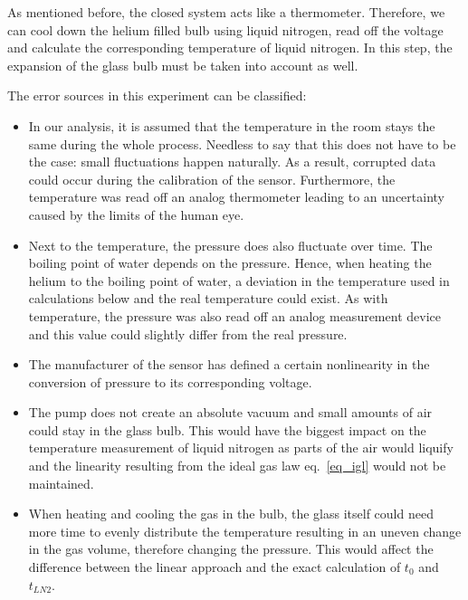     As mentioned before, the closed system acts like a thermometer.
    Therefore, we can cool down the helium filled bulb using liquid nitrogen, read off the voltage and calculate the corresponding temperature of liquid nitrogen.
    In this step, the expansion of the glass bulb must be taken into account as well.

    The error sources in this experiment can be classified:
    \begin{itemize}
        \item In our analysis, it is assumed that the temperature in the room stays the same during the whole process.
        Needless to say that this does not have to be the case: small fluctuations happen naturally.
        As a result, corrupted data could occur during the calibration of the sensor.
        Furthermore, the temperature was read off an analog thermometer leading to an uncertainty caused by the limits of the human eye.
        \item Next to the temperature, the pressure does also fluctuate over time.
        The boiling point of water depends on the pressure.
        Hence, when heating the helium to the boiling point of water, a deviation in the temperature used in calculations below and the real temperature could exist.
        As with temperature, the pressure was also read off an analog measurement device and this value could slightly differ from the real pressure.
        \item The manufacturer of the sensor has defined a certain nonlinearity in the conversion of pressure to its corresponding voltage.
        \item The pump does not create an absolute vacuum and small amounts of air could stay in the glass bulb.
        This would have the biggest impact on the temperature measurement of liquid nitrogen as parts of the air would liquify and the linearity resulting from the ideal gas law eq.~\ref{eq_igl} would not be maintained.
        \item When heating and cooling the gas in the bulb, the glass itself could need more time to evenly distribute the temperature resulting in an uneven change in the gas volume, therefore changing the pressure.
        This would affect the difference between the linear approach and the exact calculation of $t_0$ and $t_{LN2}$.
    \end{itemize}
